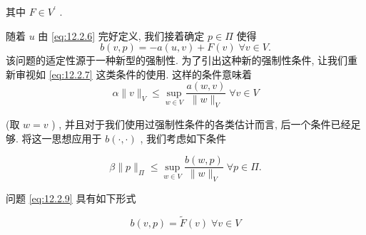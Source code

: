 其中 $F \in  {V}^{\prime }$ .\par
随着 $u$ 由 \eqref{eq:12.2.6} 完好定义, 我们接着确定 $p \in  \varPi$ 使得
\begin{equation}\label{eq:12.2.9}
b\left( {v,p}\right)  =  - a\left( {u,v}\right)  + F\left( v\right) \;\forall v \in  V.
\end{equation}
该问题的适定性源于一种新型的强制性. 为了引出这种新的强制性条件, 让我们重新审视如 \eqref{eq:12.2.7} 这类条件的使用. 这样的条件意味着
$$
\alpha \| v\|_{V} \leq  \mathop{\sup }\limits_{{w \in  V}}\frac{a\left( {w,v}\right) }{\| w\|_{V}}\;\forall v \in  V
$$

(取 $w = v$ ) , 并且对于我们使用过强制性条件的各类估计而言, 后一个条件已经足够. 将这一思想应用于 $b\left( {\cdot , \cdot  }\right)$ , 我们考虑如下条件

\begin{equation}\label{eq:12.2.10}
\beta \| p\|_{\varPi } \leq  \mathop{\sup }\limits_{{w \in  V}}\frac{b\left( {w,p}\right) }{\| w\|_{V}}\;\forall p \in  \varPi .
\end{equation}

问题 \eqref{eq:12.2.9} 具有如下形式

\begin{equation}\label{eq:12.2.11}
b\left( {v,p}\right)  = \widetilde{F}\left( v\right) \;\forall v \in  V
\end{equation}


